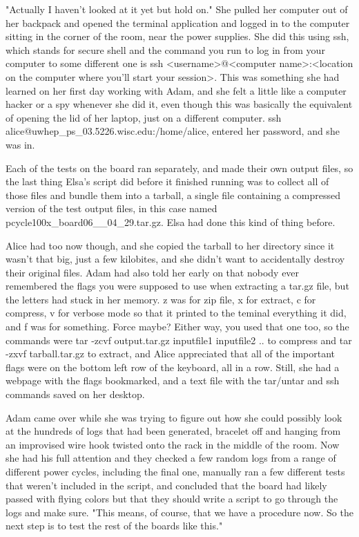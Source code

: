 "Actually I haven't looked at it yet but hold on." She pulled her computer out of her backpack and opened the terminal application and logged in to the computer sitting in the corner of the room, near the power supplies. She did this using ssh, which stands for secure shell and the command you run to log in from your computer to some different one is {\ttfamily ssh <username>@<computer name>:<location on the computer where you'll start your session>}. This was something she had learned on her first day working with Adam, and she felt a little like a computer hacker or a spy whenever she did it, even though this was basically the equivalent of opening the lid of her laptop, just on a different computer. {\ttfamily ssh alice\-@uwhep\_ps\_03\-.5226.wisc.edu:\-/home/alice}, entered her password, and she was in.

Each of the tests on the board ran separately, and made their own output files, so the last thing Elsa's script did before it finished running was to collect all of those files and bundle them into a tarball, a single file containing a compressed version of the test output files, in this case named {\ttfamily pcycle100x\_\-board06\_\_04\_29.tar.gz}. Elsa had done this kind of thing before. 

Alice had too now though, and she copied the tarball to her directory since it wasn't that big, just a few kilobites, and she didn't want to accidentally destroy their original files. Adam had also told her early on that nobody ever remembered the flags you were supposed to use when extracting a tar.gz file, but the letters had stuck in her memory. {\ttfamily z} was for zip file, {\ttfamily x} for extract, {\ttfamily c} for compress, {\ttfamily v} for verbose mode so that it printed to the teminal everything it did, and {\ttfamily f} was for something. Force maybe? Either way, you used that one too, so the commands were {\ttfamily tar -zcvf output.tar.gz inputfile1 inputfile2 ..} to compress and  {\ttfamily tar -zxvf tarball.tar.gz} to extract, and Alice appreciated that all of the important flags were on the bottom left row of the keyboard, all in a row. Still, she had a webpage with the flags bookmarked, and a text file with the tar/untar and ssh commands saved on her desktop.

\mypause

Adam came over while she was trying to figure out how she could possibly look at the hundreds of logs that had been generated, bracelet off and hanging from an improvised wire hook twisted onto the rack in the middle of the room. Now she had his full attention and they checked a few random logs from a range of different power cycles, including the final one, manually ran a few different tests that weren't included in the script, and concluded that the board had likely passed with flying colors but that they should write a script to go through the logs and make sure. "This means, of course, that we have a procedure now. So the next step is to test the rest of the boards like this." 

